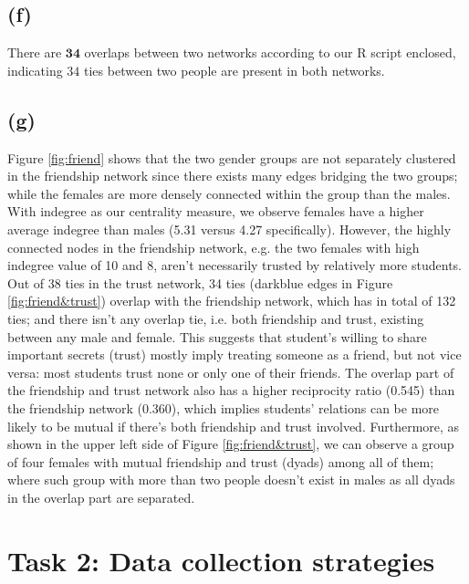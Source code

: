 \documentclass[11pt]{article}
\begin{document}
\subsection*{(f)}
There are $\mathbf{34}$ overlaps between two networks according to our R script enclosed, indicating $34$ ties between two people are present in both networks.

\subsection*{(g)}
Figure \ref{fig:friend} shows that the two gender groups are not separately clustered in the friendship network since there exists many edges bridging the two groups; while the females are more densely connected within the group than the males. With indegree as our centrality measure, we observe females have a higher average indegree than males (5.31 versus 4.27 specifically). However, the highly connected nodes in the friendship network, e.g. the two females with high indegree value of 10 and 8, aren't necessarily trusted by relatively more students. \\
Out of 38 ties in the trust network, 34 ties (darkblue edges in Figure \ref{fig:friend&trust}) overlap with the friendship network, which has in total of 132 ties; and there isn't any overlap tie, i.e. both friendship and trust, existing between any male and female. This suggests that student’s willing to share important secrets (trust) mostly imply treating someone as a friend, but not vice versa: most students trust none or only one of their friends.
The overlap part of the friendship and trust network also has a higher reciprocity ratio (0.545) than the friendship network (0.360), which implies students' relations can be more likely to be mutual if there's both friendship and trust involved. Furthermore, as shown in the upper left side of Figure \ref{fig:friend&trust}, we can observe a group of four females with mutual friendship and trust (dyads) among all of them; where such group with more than two people doesn't exist in males as all dyads in the overlap part are separated. 
 

\pagebreak

\section*{Task 2: Data collection strategies}
\end{document}

